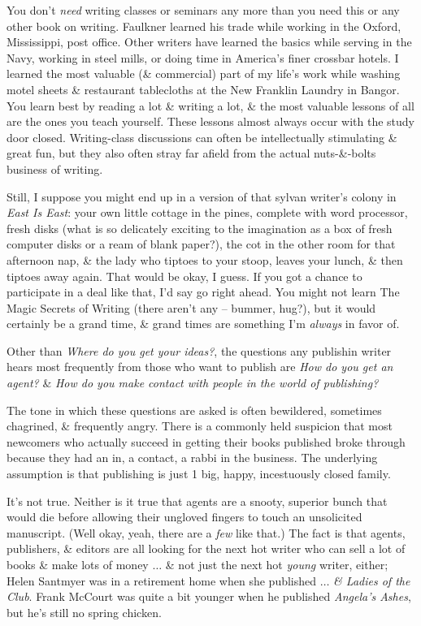 \documentclass{article}
\numberwithin{equation}{section}
\begin{document}
You don't \textit{need} writing classes or seminars any more than you need this or any other book on writing. Faulkner learned his trade while working in the Oxford, Mississippi, post office. Other writers have learned the basics while serving in the Navy, working in steel mills, or doing time in America's finer crossbar hotels. I learned the most valuable (\& commercial) part of my life's work while washing motel sheets \& restaurant tablecloths at the New Franklin Laundry in Bangor. You learn best by reading a lot \& writing a lot, \& the most valuable lessons of all are the ones you teach yourself. These lessons almost always occur with the study door closed. Writing-class discussions can often be intellectually stimulating \& great fun, but they also often stray far afield from the actual nuts-\&-bolts business of writing.

Still, I suppose you might end up in a version of that sylvan writer's colony in \textit{East Is East}: your own little cottage in the pines, complete with word processor, fresh disks (what is so delicately exciting to the imagination as a box of fresh computer disks or a ream of blank paper?), the cot in the other room for that afternoon nap, \& the lady who tiptoes to your stoop, leaves your lunch, \& then tiptoes away again. That would be okay, I guess. If you got a chance to participate in a deal like that, I'd say go right ahead. You might not learn The Magic Secrets of Writing (there aren't any -- bummer, hug?), but it would certainly be a grand time, \& grand times are something I'm \textit{always} in favor of.

 Other than \textit{Where do you get your ideas?}, the questions any publishin writer hears most frequently from those who want to publish are \textit{How do you get an agent?} \& \textit{How do you make contact with people in the world of publishing?}

The tone in which these questions are asked is often bewildered, sometimes chagrined, \& frequently angry. There is a commonly held suspicion that most newcomers who actually succeed in getting their books published broke through because they had an in, a contact, a rabbi in the business. The underlying assumption is that publishing is just 1 big, happy, incestuously closed family.

It's not true. Neither is it true that agents are a snooty, superior bunch that would die before allowing their ungloved fingers to touch an unsolicited manuscript. (Well okay, yeah, there are a \textit{few} like that.) The fact is that agents, publishers, \& editors are all looking for the next hot writer who can sell a lot of books \& make lots of money $\ldots$ \& not just the next hot \textit{young} writer, either; Helen Santmyer was in a retirement home when she published $\ldots$ \textit{\& Ladies of the Club}. Frank McCourt was quite a bit younger when he published \textit{Angela's Ashes}, but he's still no spring chicken.
\end{document}

